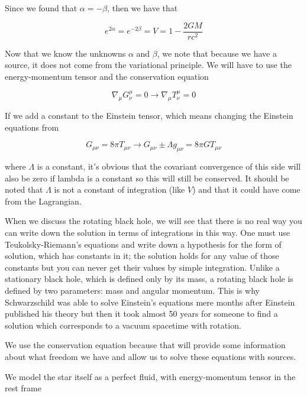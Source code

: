\documentclass[12pt]{extarticle}
\begin{document}
Since we found that $\alpha=-\beta$, then we have that

\begin{equation}
e^{2\alpha}=e^{-2\beta}=V=1-\frac{2GM}{rc^2}
\end{equation}

Now that we know the unknowns $\alpha$ and $\beta$, we note that because we have a source, it does not come from the variational principle. We will have to use the energy-momentum tensor and the conservation equation

\begin{equation}
\nabla_\mu G^\mu_\nu = 0 \rightarrow \nabla_\mu T^\mu_\nu = 0
\end{equation}

If we add a constant to the Einstein tensor, which means changing the Einstein equations from 

\begin{equation}
G_{\mu\nu} = 8\pi T_{\mu\nu} \rightarrow G_{\mu\nu} \pm \Lambda g_{\mu\nu} = 8\pi G T_{\mu\nu}
\end{equation}

where $\Lambda$ is a constant, it's obvious that the covariant convergence of this side will also be zero if lambda is a constant so this will still be conserved. It should be noted that $\Lambda$ is not a constant of integration (like $V$) and that it could have come from the Lagrangian.

When we discuss the rotating black hole, we will see that there is no real way you can write down the solution in terms of integrations in this way. One must use Teukolsky-Riemann's equations and write down a hypothesis for the form of solution, which has constants in it; the solution holds for any value of those constants but you can never get their values by simple integration. Unlike a stationary black hole, which is defined only by its mass, a rotating black hole is defined by two parameters: mass and angular momentum. This is why Schwarzschild was able to solve Einstein's equations mere months after Einstein published his theory but then it took almost 50 years for someone to find a solution which corresponds to a vacuum spacetime with rotation. 

We use the conservation equation because that will provide some information about what freedom we have and allow us to solve these equations with sources.

We model the star itself as a perfect fluid, with energy-momentum tensor in the rest frame
\end{document}
